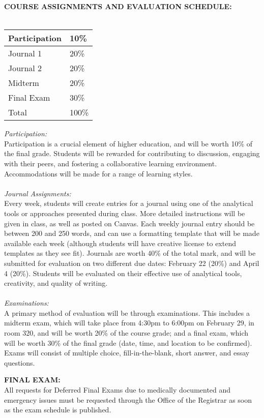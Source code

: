\documentclass[10pt]{article}
\begin{document}
\textbf{COURSE ASSIGNMENTS AND EVALUATION SCHEDULE:}\\\\
{\renewcommand{\arraystretch}{1.2}
\begin{tabular}{|l|l|}\hline
	Participation & 10\% \\\hline
	Journal 1 & 20\% \\\hline
	Journal 2 & 20\% \\\hline
	Midterm & 20\% \\\hline
	Final Exam & 30\% \\\hline\hline
	Total & 100\% \\\hline
\end{tabular}
}

\textit{Participation:}\\ 
Participation is a crucial element of higher education, and will be worth 10\% of the final grade. Students will be rewarded for contributing to discussion, engaging with their peers, and fostering a collaborative learning environment. Accommodations will be made for a range of learning styles.\\\\
\textit{Journal Assignments:}\\
Every week, students will create entries for a journal using one of the analytical tools or approaches presented during class. More detailed instructions will be given in class, as well as posted on Canvas. Each weekly journal entry should be between 200 and 250 words, and can use a formatting template that will be made available each week (although students will have creative license to extend templates as they see fit). Journals are worth 40\% of the total mark, and will be submitted for evaluation on two different due dates: February 22 (20\%) and April 4 (20\%). Students will be evaluated on their effective use of analytical tools, creativity, and quality of writing.\\\\
\textit{Examinations:}\\ 
A primary method of evaluation will be through examinations. This includes a midterm exam, which will take place from 4:30pm to 6:00pm on February 29, in room 320, and will be worth 20\% of the course grade; and a final exam, which will be worth 30\% of the final grade (date, time, and location to be confirmed). Exams will consist of multiple choice, fill-in-the-blank, short answer, and essay questions. 

\textbf{FINAL EXAM:}\\
All requests for Deferred Final Exams due to medically documented and emergency issues must be requested through the Office of the Registrar as soon as the exam schedule is published.
\end{document}
